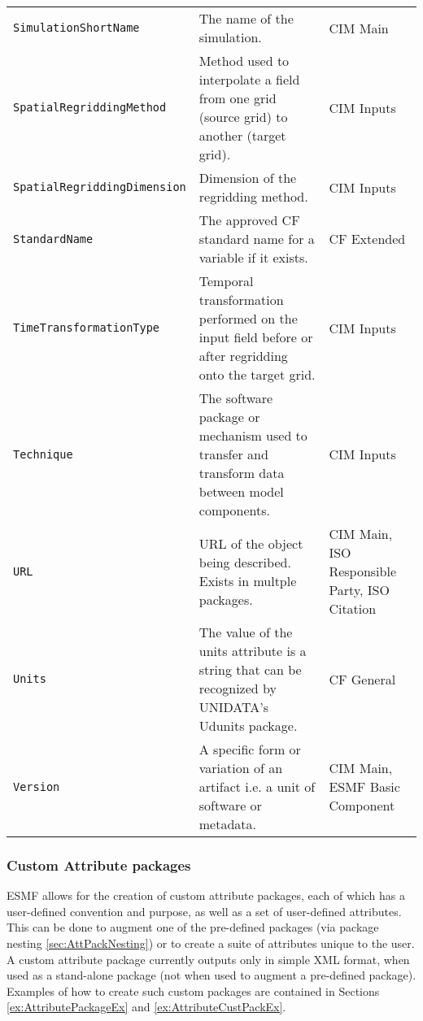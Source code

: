\begin{longtable}{|p{7cm}|p{5cm}|p{15mm}|}
     {\tt SimulationShortName} & The name of the simulation. & CIM Main\\
     {\tt SpatialRegriddingMethod} & Method used to interpolate a field from one grid (source grid) to another (target grid). & CIM Inputs\\ 
     {\tt SpatialRegriddingDimension} & Dimension of the regridding method. & CIM Inputs\\
     {\tt StandardName} & The approved CF standard name for a variable if it exists. &  CF Extended\\
     {\tt TimeTransformationType} & Temporal transformation performed on the input field before or after regridding onto the target grid.& CIM Inputs\\ 
     {\tt Technique} & The software package or mechanism used to transfer and transform data between model components. & CIM Inputs\\ 
     {\tt URL} & URL of the object being described. Exists in multple packages. & CIM Main, ISO Responsible Party, ISO Citation\\
     {\tt Units}  & The value of the units attribute is a string that can be recognized by UNIDATA's Udunits package. & CF General\\
     {\tt Version} & A specific form or variation of an artifact i.e. a unit of software or metadata. & CIM Main, ESMF Basic Component\\ 
\hline\hline
\end{longtable}

\vspace{.20in}

\subsubsection{Custom Attribute packages}
\label{sec:CustomAttPacks}

ESMF allows for the creation of custom attribute packages, each of which has a user-defined convention and purpose, as well as a set of user-defined attributes. This can be done to augment one of the pre-defined packages (via package nesting \ref{sec:AttPackNesting}) or to create a suite of attributes unique to the user. A custom attribute package currently outputs only in simple XML format, when used as a stand-alone package (not when used to augment a pre-defined package).  Examples of how to create such custom packages are contained in Sections \ref{ex:AttributePackageEx} and \ref{ex:AttributeCustPackEx}.
